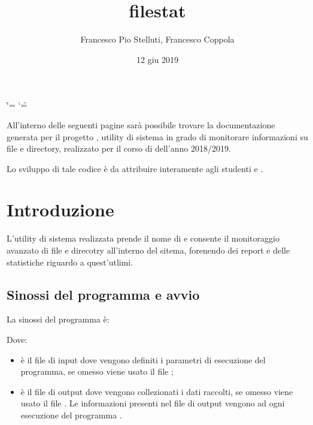 \documentclass[letterpaper,10pt,italian,openany,oneside]{sphinxmanual}
\title{filestat}
\date{12 giu 2019}
\author{Francesco Pio Stelluti, Francesco Coppola}
\begin{document}
\ifdefined\shorthandoff
  \ifnum\catcode`\=\string=\active\shorthandoff{=}\fi
  \ifnum\catcode`\"=\active{}\fi
\fi

\pagestyle{empty}
\sphinxmaketitle
\pagestyle{plain}
\sphinxtableofcontents
\pagestyle{normal}
\label{\detokenize{index::doc}}


All’interno delle seguenti pagine sarà possibile trovare la documentazione
generata per il progetto , utility di sistema in grado di monitorare informazioni
su file e directory, realizzato per il corso di 
dell’anno 2018/2019.

Lo sviluppo di tale codice è da attribuire interamente agli studenti  e .


\chapter{Introduzione}
\label{\detokenize{introduzione:introduzione}}\label{\detokenize{introduzione::doc}}\begin{quote}

\end{quote}

L’utility di sistema realizzata prende il nome di  e consente il monitoraggio avanzato di
file e direcotry all’interno del sitema, forenendo dei report e delle statistiche riguardo a quest’utlimi.


\section{Sinossi del programma e avvio}
\label{\detokenize{introduzione:sinossi-del-programma-e-avvio}}
La sinossi del programma è:

\begin{sphinxVerbatim}[commandchars=\\\{\}]
 \PYG{p}{[}\PYG{p}{]} \PYG{p}{[}\PYG{p}{]} \PYG{p}{[}\PYG{p}{]}
\end{sphinxVerbatim}

Dove:
\begin{itemize}
\item {} 
 è il file di input dove vengono definiti i parametri di esecuzione del programma, se omesso viene usato il file ;

\item {} 
 è il file di output dove vengono collezionati i dati raccolti, se omesso viene usato il file . Le informazioni presenti nel file di output vengono  ad ogni esecuzione del programma .

\end{itemize}
\end{document}
